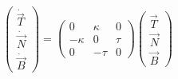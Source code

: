 \begin{equation*} \label{matrix}
\left( \begin{array}{ccc}
\dot{\vec{T}}\\
\dot{\vec{N}}\\
\dot{\vec{B}}
\end{array} \right )
=
\left(\begin{array}{ccc}
 0 & \kappa & 0 \\
-\kappa & 0 & \tau\\
0 & -\tau & 0\end{array} \right )\left( \begin{array}{ccc}
\vec{T}\\
\vec{N}\\
\vec{B}
\end{array}\right)
\end{equation*}

